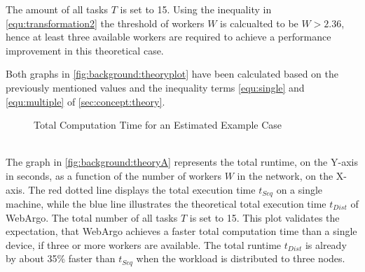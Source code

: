 The amount of all tasks $T$ is set to 15. Using the inequality in \eqref{equ:transformation2} the threshold of workers $W$ is calcualted to be $W > 2.36$, hence at least three available workers are required to achieve a performance improvement in this theoretical case.

Both graphs in \autoref{fig:background:theoryplot} have been calculated based on the previously mentioned values and the inequality terms \eqref{equ:single} and \eqref{equ:multiple} of \autoref{sec:concept:theory}.
\begin{figure}[htbp]
  \myfloatalign
   \caption{Total Computation Time for an Estimated Example Case}
   \label{fig:background:theoryplot}
\end{figure}
~\\
The graph in \autoref{fig:background:theoryA} represents the total runtime, on the Y-axis in seconds, as a function of the number of workers $W$ in the network, on the X-axis. The red dotted line displays the total execution time $t_{Seq}$ on a single machine, while the blue line illustrates the theoretical total execution time $t_{Dist}$ of WebArgo. The total number of all tasks $T$ is set to 15. This plot validates the expectation, that WebArgo achieves a faster total computation time than a single device, if three or more workers are available. The total runtime $t_{Dist}$ is already by about 35\% faster than $t_{Seq}$ when the workload is distributed to three nodes. 

